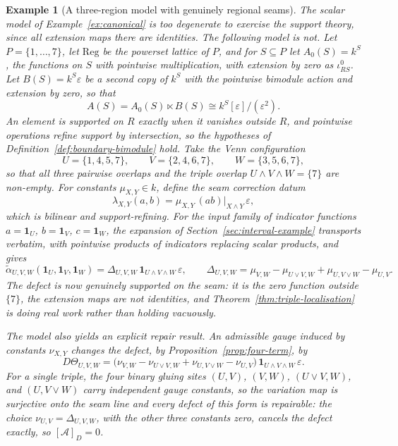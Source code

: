 \documentclass[11pt]{article}
\newtheorem{example}[theorem]{Example}
\newcommand{\Reg}{\mathrm{Reg}}
\begin{document}
\begin{example}[A three-region model with genuinely regional seams]
\label{ex:venn}
The scalar model of Example~\ref{ex:canonical} is too degenerate to exercise the support theory, since all extension maps there are identities. The following model is not. Let \(P=\{1,\ldots,7\}\), let \(\Reg\) be the powerset lattice of \(P\), and for \(S\subseteq P\) let \(A_0(S)=k^S\), the functions on \(S\) with pointwise multiplication, with extension by zero as \(\iota^0_{RS}\). Let \(B(S)=k^S\varepsilon\) be a second copy of \(k^S\) with the pointwise bimodule action and extension by zero, so that
\[
A(S)=A_0(S)\ltimes B(S)\cong k^S[\varepsilon]/(\varepsilon^2).
\]
An element is supported on \(R\) exactly when it vanishes outside \(R\), and pointwise operations refine support by intersection, so the hypotheses of Definition~\ref{def:boundary-bimodule} hold. Take the Venn configuration
\[
U=\{1,4,5,7\},
\qquad
V=\{2,4,6,7\},
\qquad
W=\{3,5,6,7\},
\]
so that all three pairwise overlaps and the triple overlap \(U\wedge V\wedge W=\{7\}\) are non-empty. For constants \(\mu_{X,Y}\in k\), define the seam correction datum
\[
\lambda_{X,Y}(a,b)=\mu_{X,Y}\,(ab)\rvert_{X\wedge Y}\,\varepsilon,
\]
which is bilinear and support-refining. For the input family of indicator functions \(a=\mathbf 1_U\), \(b=\mathbf 1_V\), \(c=\mathbf 1_W\), the expansion of Section~\ref{sec:interval-example} transports verbatim, with pointwise products of indicators replacing scalar products, and gives
\[
\widetilde\alpha_{U,V,W}(\mathbf 1_U,\mathbf 1_V,\mathbf 1_W)
=\Delta_{U,V,W}\,\mathbf 1_{U\wedge V\wedge W}\,\varepsilon,
\qquad
\Delta_{U,V,W}
=\mu_{V,W}-\mu_{U\vee V,W}+\mu_{U,V\vee W}-\mu_{U,V}.
\]
The defect is now genuinely supported on the seam: it is the zero function outside \(\{7\}\), the extension maps are not identities, and Theorem~\ref{thm:triple-localisation} is doing real work rather than holding vacuously.

The model also yields an explicit repair result. An admissible gauge induced by constants \(\nu_{X,Y}\) changes the defect, by Proposition~\ref{prop:four-term}, by
\[
D\Theta_{U,V,W}
=\bigl(\nu_{V,W}-\nu_{U\vee V,W}+\nu_{U,V\vee W}-\nu_{U,V}\bigr)\,\mathbf 1_{U\wedge V\wedge W}\,\varepsilon.
\]
For a single triple, the four binary gluing sites \((U,V)\), \((V,W)\), \((U\vee V,W)\), and \((U,V\vee W)\) carry independent gauge constants, so the variation map is surjective onto the seam line and every defect of this form is repairable: the choice \(\nu_{U,V}=\Delta_{U,V,W}\), with the other three constants zero, cancels the defect exactly, so \([\mathcal A]_D=0\).
\end{example}
\end{document}
